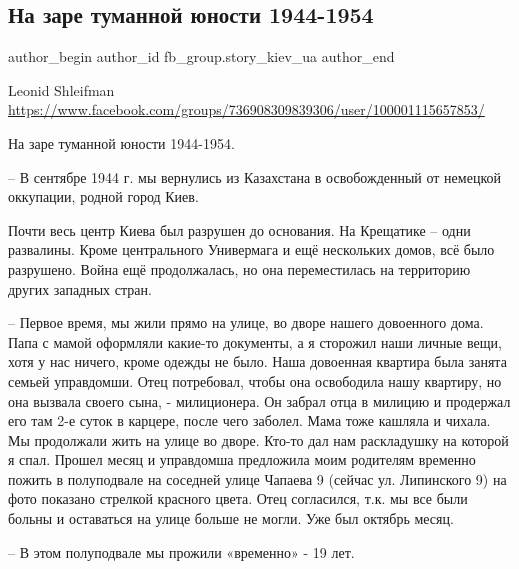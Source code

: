  
 
 
 
 
 
\subsection{На заре туманной юности 1944-1954}
\label{sec:25_05_2021.fb.fb_group.story_kiev_ua.2.na_zare_tumannoj_junosti}
\ifcmt
 author_begin
   author_id fb_group.story_kiev_ua
 author_end
\fi

Leonid Shleifman
\url{https://www.facebook.com/groups/736908309839306/user/100001115657853/}

На заре туманной юности 1944-1954.

– В сентябре 1944 г. мы вернулись из Казахстана в освобожденный от немецкой оккупации,  родной город Киев.  

Почти весь центр Киева был разрушен до основания. На Крещатике – одни
развалины. Кроме центрального Универмага и ещё нескольких домов, всё было
разрушено. Война ещё продолжалась, но она переместилась на территорию других
западных стран. 

– Первое время, мы жили прямо на улице, во дворе нашего довоенного дома. Папа с
мамой оформляли какие-то документы, а я сторожил наши личные  вещи, хотя у нас
ничего, кроме одежды не было. Наша довоенная квартира была занята семьей
управдомши. Отец потребовал, чтобы она освободила нашу  квартиру, но она
вызвала своего сына, - милиционера. Он забрал отца в милицию и продержал его
там 2-е суток в карцере, после чего заболел. Мама тоже кашляла и чихала. Мы
продолжали жить на улице во дворе. Кто-то дал нам раскладушку на которой я
спал. Прошел месяц и  управдомша предложила моим родителям временно пожить в
полуподвале на соседней улице Чапаева 9  (сейчас ул. Липинского  9) на фото
показано стрелкой красного цвета. Отец согласился, т.к. мы все были больны и
оставаться на улице больше не могли.  Уже был октябрь месяц.

– В этом полуподвале мы прожили «временно» -  19 лет.


